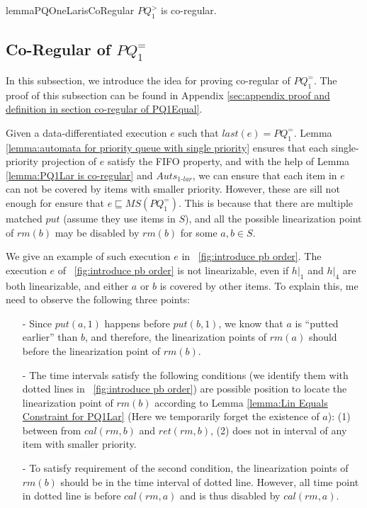 \begin{restatable}{lemma}{PQOneLarisCoRegular}
\label{lemma:PQ1Lar is co-regular}
$\textit{PQ}_1^{>}$ is co-regular.
\end{restatable}




\subsection{Co-Regular of $\textit{PQ}_1^{=}$}
\label{subsec:co-regular of PQ1Equal}

In this subsection, we introduce the idea for proving co-regular of $\textit{PQ}_1^{=}$. The proof of this subsection can be found in Appendix \ref{sec:appendix proof and definition in section co-regular of PQ1Equal}.

Given a data-differentiated execution $e$ such that $\textit{last}(e) = \textit{PQ}_1^{=}$. Lemma \ref{lemma:automata for priority queue with single priority} ensures that each single-priority projection of $e$ satisfy the FIFO property, and with the help of Lemma \ref{lemma:PQ1Lar is co-regular} and $\textit{Auts}_{\textit{1-lar}}$, we can ensure that each item in $e$ can not be covered by items with smaller priority. However, these are sill not enough for ensure that $e \sqsubseteq \textit{MS}(\textit{PQ}_1^{=})$. This is because that there are multiple matched $\textit{put}$ (assume they use items in $S$), and all the possible linearization point of $\textit{rm}(b)$ may be disabled by $\textit{rm}(b)$ for some $a,b \in S$.

We give an example of such execution $e$ in \figurename~\ref{fig:introduce pb order}. The execution $e$ of \figurename~\ref{fig:introduce pb order} is not linearizable, even if $h \vert_{1}$ and $h \vert_{4}$ are both linearizable, and either $a$ or $b$ is covered by other items. To explain this, me need to observe the following three points:

\begin{itemize}
\setlength{\itemsep}{0.5pt}
\item[-] Since $\textit{put}(a,1)$ happens before $\textit{put}(b,1)$, we know that $a$ is ``putted earlier'' than $b$, and therefore, the linearization points of $\textit{rm}(a)$ should before the linearization point of $\textit{rm}(b)$.

\item[-] The time intervals satisfy the following conditions (we identify them with dotted lines in \figurename~\ref{fig:introduce pb order}) are possible position to locate the linearization point of $\textit{rm}(b)$ according to Lemma \ref{lemma:Lin Equals Constraint for PQ1Lar} (Here we temporarily forget the existence of $a$): (1) between from $\textit{cal}(\textit{rm},b)$ and $\textit{ret}(\textit{rm},b)$, (2) does not in interval of any item with smaller priority.

\item[-] To satisfy requirement of the second condition, the linearization points of $\textit{rm}(b)$ should be in the time interval of dotted line. However, all time point in dotted line is before $\textit{cal}(\textit{rm},a)$ and is thus disabled by $\textit{cal}(\textit{rm},a)$.
\end{itemize}

